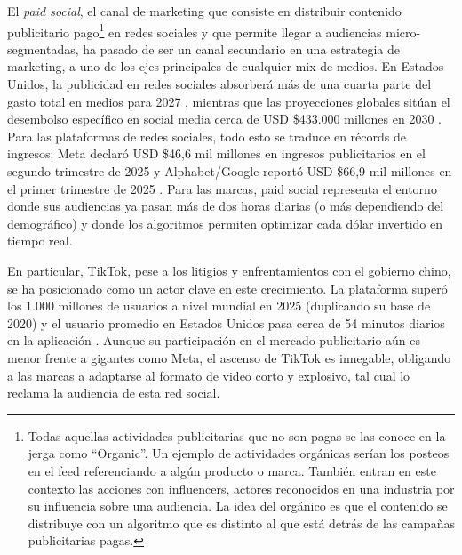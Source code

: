 \documentclass[12pt, a4paper]{report}
\begin{document}
El \textit{paid social}, el canal de marketing que consiste en distribuir contenido publicitario
pago\footnote{Todas aquellas actividades publicitarias que no son pagas se las conoce en la jerga como
``Organic''. Un ejemplo de actividades orgánicas serían los posteos en el feed referenciando a algún
producto o marca. También entran en este contexto las acciones con influencers, actores reconocidos
en una industria por su influencia sobre una audiencia. La idea del orgánico es que el contenido se
distribuye con un algoritmo que es distinto al que está detrás de las campañas publicitarias pagas.}
en redes sociales y que permite llegar a audiencias micro-segmentadas, ha
pasado de ser un canal secundario en una estrategia de marketing, a uno de los
ejes principales de cualquier mix de medios. En Estados Unidos, la publicidad en redes
sociales absorberá más de una cuarta parte del gasto total en medios para 2027
\citep{emarketer2024}, mientras que las proyecciones globales sitúan el desembolso
específico en social media cerca de USD \$433.000 millones en 2030 \citep{digitalsilk2025}.
Para las plataformas de redes sociales, todo esto se traduce en récords de
ingresos: Meta declaró USD \$46,6 mil millones en ingresos publicitarios en el
segundo trimestre de 2025 \citep{meta2025} y Alphabet/Google reportó USD \$66,9 mil
millones en el primer trimestre de 2025 \citep{schwartz2025}. Para las marcas, paid
social representa el entorno donde sus audiencias ya pasan más de dos horas
diarias (o más dependiendo del demográfico) y donde los algoritmos permiten
optimizar cada dólar invertido en tiempo real.


En particular, TikTok, pese a los litigios y enfrentamientos con el gobierno chino,
se ha posicionado como un actor clave en este crecimiento. La plataforma superó los
1.000 millones de usuarios a nivel mundial en 2025 (duplicando su base de 2020)
\citep{backlink2025} y el usuario promedio en Estados Unidos pasa cerca de 54 minutos
diarios en la aplicación \citep{emarketer2025}. Aunque su participación en el mercado
publicitario aún es menor frente a gigantes como Meta, el ascenso de TikTok es innegable,
obligando a las marcas a adaptarse al formato de video corto y explosivo, tal cual
lo reclama la audiencia de esta red social.
\end{document}

